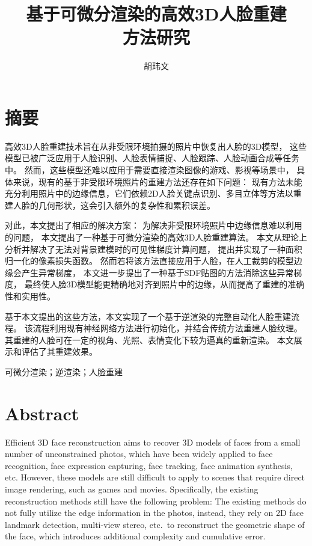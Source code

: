 \documentclass{scutmaster}
\title{基于可微分渲染的高效3D人脸重建\texorpdfstring{\\}{}方法研究}
\author{胡玮文}
\begin{document}
\maketitle
\hideinblind{
    \maketitleEN
    \nominationpage
    \declareoforiginality
}

\frontmatter
\chapter{摘\texorpdfstring{\quad}{}要}

高效3D人脸重建技术旨在从非受限环境拍摄的照片中恢复出人脸的3D模型，
这些模型已被广泛应用于人脸识别、人脸表情捕捉、人脸跟踪、人脸动画合成等任务中。
然而，这些模型还难以应用于需要直接渲染图像的游戏、影视等场景中，
具体来说，现有的基于非受限环境照片的重建方法还存在如下问题：
现有方法未能充分利用照片中的边缘信息，它们依赖2D人脸关键点识别、多目立体等方法以重建人脸的几何形状，这会引入额外的复杂性和累积误差。

对此，本文提出了相应的解决方案：
为解决非受限环境照片中边缘信息难以利用的问题，
本文提出了一种基于可微分渲染的高效3D人脸重建算法。
本文从理论上分析并解决了无法对背景建模时的可见性梯度计算问题，
提出并实现了一种面积归一化的像素损失函数。
然而若将该方法直接应用于人脸，在人工裁剪的模型边缘会产生异常梯度，
本文进一步提出了一种基于SDF贴图的方法消除这些异常梯度，
最终使人脸3D模型能更精确地对齐到照片中的边缘，从而提高了重建的准确性和实用性。

基于本文提出的这些方法，本文实现了一个基于逆渲染的完整自动化人脸重建流程。
该流程利用现有神经网络方法进行初始化，并结合传统方法重建人脸纹理。
其重建的人脸可在一定的视角、光照、表情变化下较为逼真的重新渲染。
本文展示和评估了其重建效果。

 可微分渲染；逆渲染；人脸重建

\chapter{Abstract}

Efficient 3D face reconstruction aims to recover 3D models of faces from a small number of unconstrained photos,
which have been widely applied to face recognition, face expression capturing, face tracking, face animation synthesis, etc.
However, these models are still difficult to apply to scenes that require direct image rendering, such as games and movies.
Specifically, the existing reconstruction methods still have the following problem:
The existing methods do not fully utilize the edge information in the photos,
instead, they rely on 2D face landmark detection, multi-view stereo, etc.\ to reconstruct the geometric shape of the face,
which introduces additional complexity and cumulative error.
\end{document}
